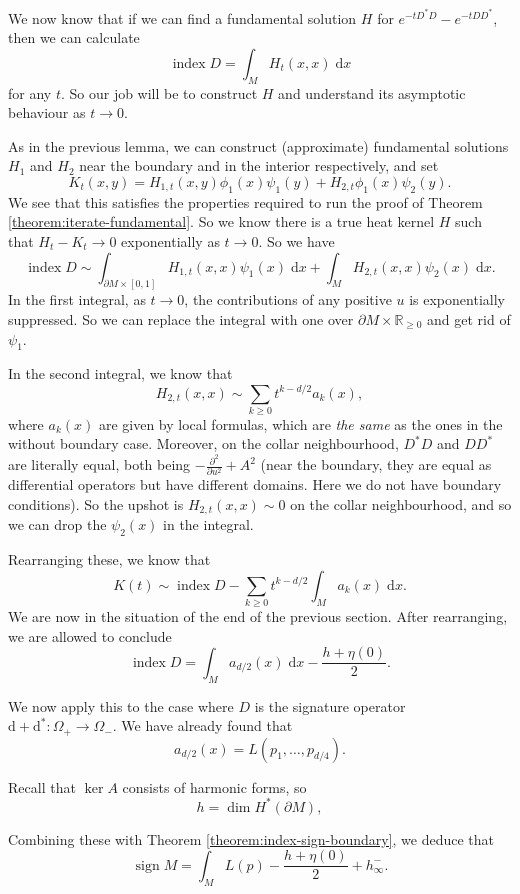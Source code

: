 \documentclass{shortart}
\theoremstyle{definition}
\newcommand\R{\mathbb{R}}
\renewcommand\d{\mathrm{d}}
\DeclareMathOperator\idx{index}
\DeclareMathOperator\sign{sign}
\begin{document}
We now know that if we can find a fundamental solution $H$ for $e^{-t D^*D} - e^{-t DD^*}$, then we can calculate
\[
  \idx D = \int_M H_t(x, x)\;\d x
\]
for any $t$. So our job will be to construct $H$ and understand its asymptotic behaviour as $t \to 0$.

As in the previous lemma,  we can construct (approximate) fundamental solutions $H_1$ and $H_2$ near the boundary and in the interior respectively, and set
\[
  K_t(x, y) = H_{1, t}(x, y) \phi_1(x) \psi_1(y) + H_{2, t} \phi_1(x) \psi_2(y).
\]
We see that this satisfies the properties required to run the proof of Theorem \ref{theorem:iterate-fundamental}. So we know there is a true heat kernel $H$ such that $H_t - K_t \to 0$ exponentially as $t \to 0$. So we have
\[
  \idx D \sim \int_{\partial M \times [0, 1]} H_{1, t}(x, x) \psi_1(x) \;\d x + \int_M H_{2, t}(x, x)\psi_2(x)\;\d x.
\]
In the first integral, as $t \to 0$, the contributions of any positive $u$ is exponentially suppressed. So we can replace the integral with one over $\partial M \times \R_{\geq 0}$ and get rid of $\psi_1$.

In the second integral, we know that
\[
  H_{2, t}(x, x) \sim \sum_{k \geq 0} t^{k - d/2} a_k(x),
\]
where $a_k(x)$ are given by local formulas, which are \emph{the same} as the ones in the without boundary case. Moreover, on the collar neighbourhood, $D^*D$ and $DD^*$ are literally equal, both being $-\frac{\partial^2}{\partial u^2} + A^2$ (near the boundary, they are equal as differential operators but have different domains. Here we do not have boundary conditions). So the upshot is $H_{2, t}(x, x) \sim 0$ on the collar neighbourhood, and so we can drop the $\psi_2(x)$ in the integral.

Rearranging these, we know that
\[
  K(t) \sim \idx D - \sum_{k \geq 0} t^{k - d/2} \int_M a_k(x)\;\d x.
\]
We are now in the situation of the end of the previous section. After rearranging, we are allowed to conclude
\[
  \idx D = \int_M a_{d/2}(x) \;\d x - \frac{h + \eta(0)}{2}.
\]

We now apply this to the case where $D$ is the signature operator $\d + \d^*\colon \Omega_+ \to \Omega_-$. We have already found that
\[
  a_{d/2}(x) = L(p_1, \ldots, p_{d/4}).
\]

Recall that $\ker A$ consists of harmonic forms, so
\[
  h = \dim H^*(\partial M),
\]

Combining these with Theorem \ref{theorem:index-sign-boundary}, we deduce that
\[
  \sign M = \int_M L(p) - \frac{h + \eta(0)}{2} + h^-_\infty.
\]
\end{document}
